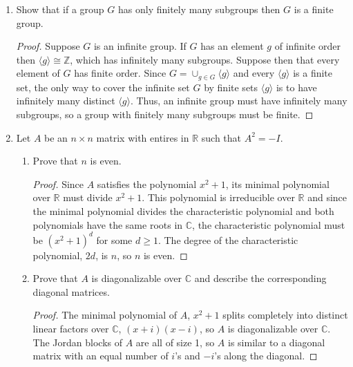 \documentclass[11pt,letterpaper]{report}
\newcommand{\integers}{\mathbb{Z}}
\newcommand{\complex}{\mathbb{C}}
\newcommand{\reals}{\mathbb{R}}
\newcommand{\rationals}{\mathbb{Q}}
\newenvironment{solution}
{\begin{proof}[Solution]}
{\end{proof}}
\begin{document}
\begin{enumerate}
\begin{enumerate}
\begin{solution}
			\noindent The ideal $P_2 = (x^2)$ is not prime since $x\cdot x$ is in $P_2$ but $x$ is not. Since maximal ideals are always prime, this shows that $P_2$ isn't maximal either.\\

			\noindent The ideal $P_3 = (x)$ is prime but not maximal since $R/P_3 = \rationals[y]$, which is an integral domain but not a field.
		\end{solution}
	\end{enumerate}

	\item Show that if a group $G$ has only finitely many subgroups then $G$ is a finite group.
	\begin{proof}
		Suppose $G$ is an infinite group. If $G$ has an element $g$ of infinite order then $\langle g\rangle\cong \integers$, which has infinitely many subgroups. Suppose then that every element of $G$ has finite order. Since $G = \cup_{g\in G}\langle g\rangle$ and every $\langle g\rangle$ is a finite set, the only way to cover the infinite set $G$ by finite sets $\langle g\rangle$ is to have infinitely many distinct $\langle g\rangle$. Thus, an infinite group must have infinitely many subgroups, so a group with finitely many subgroups must be finite.
	\end{proof}

	\item Let $A$ be an $n\times n$ matrix with entires in $\reals$ such that $A^2 = -I$.
	\begin{enumerate}
		\item Prove that $n$ is even.
		\begin{proof}
			Since $A$ satisfies the polynomial $x^2+1$, its minimal polynomial over $\mathbb{R}$ must divide $x^2+1$. This polynomial is irreducible over $\mathbb{R}$ and since the minimal polynomial divides the characteristic polynomial and both polynomials have the same roots in $\complex$, the characteristic polynomial must be $(x^2+1)^d$ for some $d\geq 1$. The degree of the characteristic polynomial, $2d$, is $n$, so $n$ is even.
		\end{proof}
		\item Prove that $A$ is diagonalizable over $\complex$ and describe the corresponding diagonal matrices.
		\begin{proof}
			The minimal polynomial of $A$, $x^2+1$ splits completely into distinct linear factors over $\complex$, $(x+i)(x-i)$, so $A$ is diagonalizable over $\complex$. The Jordan blocks of $A$ are all of size 1, so $A$ is similar to a diagonal matrix with an equal number of $i$'s and $-i$'s along the diagonal. 
		\end{proof}
	\end{enumerate}


\end{enumerate}
\end{document}
